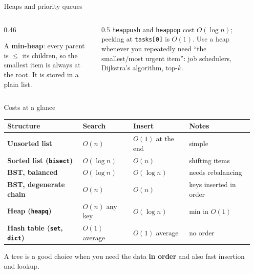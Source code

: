 \documentclass[aspectratio=169,10pt]{beamer}
\begin{document}
\begin{frame}{Heaps and priority queues}
\begin{columns}[T]
\begin{column}{0.46\textwidth}
\begin{sfig}[0.55]
\end{sfig}
{\small A \textbf{min-heap}: every parent is $\le$ its children, so the smallest item is always at the root. It is stored in a plain list.}
\end{column}
\begin{column}{0.5\textwidth}
\vspace{2mm}
\vspace{2mm}
{\small
\texttt{heappush} and \texttt{heappop} cost $O(\log n)$; peeking at \texttt{tasks[0]} is $O(1)$. Use a heap whenever you repeatedly need ``the smallest/most urgent item'': job schedulers, Dijkstra's algorithm, top-$k$.}
\end{column}
\end{columns}
\end{frame}

\begin{frame}{Costs at a glance}
\renewcommand{\arraystretch}{1.32}\footnotesize
\begin{tabular}{@{}>{\raggedright\bfseries}p{42mm}>{\raggedright}p{32mm}>{\raggedright}p{30mm}>{\raggedright\arraybackslash}p{38mm}@{}}
\toprule
Structure & Search & Insert & Notes\\\midrule
Unsorted list & $O(n)$ & $O(1)$ at the end & simple\\
Sorted list (\texttt{bisect}) & $O(\log n)$ & $O(n)$ & shifting items\\
BST, balanced & $O(\log n)$ & $O(\log n)$ & needs rebalancing\\
BST, degenerate chain & $O(n)$ & $O(n)$ & keys inserted in order\\
Heap (\texttt{heapq}) & $O(n)$ any key & $O(\log n)$ & min in $O(1)$\\
Hash table (\texttt{set}, \texttt{dict}) & $O(1)$ average & $O(1)$ average & no order\\
\bottomrule
\end{tabular}
\vspace{4mm}

{\small A tree is a good choice when you need the data \textbf{in order} and also fast insertion and lookup.}
\end{frame}
\end{document}
